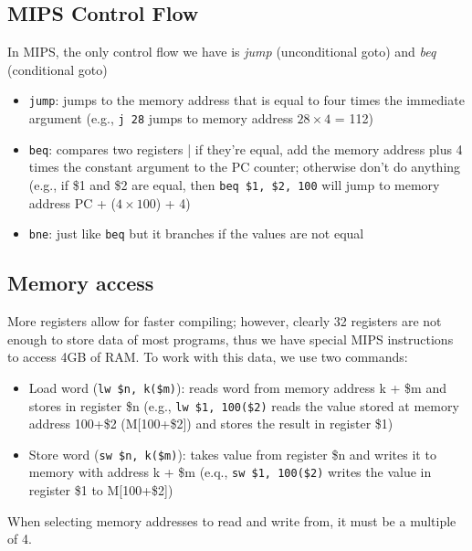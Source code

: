 \documentclass{report}
\begin{document}
\subsection{MIPS Control Flow}
In MIPS, the only control flow we have is \textit{jump} (unconditional goto) and \textit{beq} (conditional goto)
\begin{itemize}
\item \texttt{jump}: jumps to the memory address that is equal to four times the immediate argument (e.g., \texttt{j 28} jumps to memory address $28 \times 4$ = 112)
\item \texttt{beq}: compares two registers | if they're equal, add the memory address plus 4 times the constant argument to the PC counter; otherwise don't do anything (e.g., if \$1 and \$2 are equal, then \texttt{beq \$1, \$2, 100} will jump to memory address PC + ($4 \times 100$) + 4)
\item \texttt{bne}: just like \texttt{beq} but it branches if the values are not equal
\end{itemize}

\subsection{Memory access}
More registers allow for faster compiling; however, clearly 32 registers are not enough to store data of most programs, thus we have special MIPS instructions to access 4GB of RAM. To work with this data, we use two commands:
\begin{itemize}
\item Load word (\texttt{lw \$n, k(\$m)}): reads word from memory address k + \$m and stores in register \$n (e.g., \texttt{lw \$1, 100(\$2)} reads the value stored at memory address 100+\$2 (M[100+\$2]) and stores the result in register \$1)
\item Store word (\texttt{sw \$n, k(\$m)}): takes value from register \$n and writes it to memory with address k + \$m (e.q., \texttt{sw \$1, 100(\$2)} writes the value in register \$1 to M[100+\$2])
\end{itemize}
When selecting memory addresses to read and write from, it must be a multiple of 4.
\end{document}
